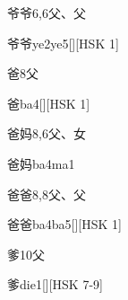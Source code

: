 \begin{Entry}{爷爷}{6,6}{⽗、⽗}
  \begin{Phonetics}{爷爷}{ye2ye5}[][HSK 1]
  \end{Phonetics}
\end{Entry}

\begin{Entry}{爸}{8}{⽗}
  \begin{Phonetics}{爸}{ba4}[][HSK 1]
  \end{Phonetics}
\end{Entry}

\begin{Entry}{爸妈}{8,6}{⽗、⼥}
  \begin{Phonetics}{爸妈}{ba4ma1}
  \end{Phonetics}
\end{Entry}

\begin{Entry}{爸爸}{8,8}{⽗、⽗}
  \begin{Phonetics}{爸爸}{ba4ba5}[][HSK 1]
  \end{Phonetics}
\end{Entry}

\begin{Entry}{爹}{10}{⽗}
  \begin{Phonetics}{爹}{die1}[][HSK 7-9]
  \end{Phonetics}
\end{Entry}


